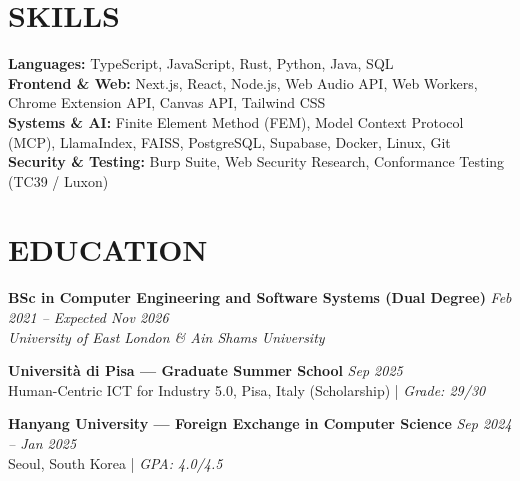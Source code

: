 \documentclass[10pt,letterpaper]{article}
\begin{document}
\section*{SKILLS}
\begin{itemize}[leftmargin=0pt, label={}]
    \small{\item{
     \textbf{Languages:} TypeScript, JavaScript, Rust, Python, Java, SQL \\
     \textbf{Frontend \& Web:} Next.js, React, Node.js, Web Audio API, Web Workers, Chrome Extension API, Canvas API, Tailwind CSS \\
     \textbf{Systems \& AI:} Finite Element Method (FEM), Model Context Protocol (MCP), LlamaIndex, FAISS, PostgreSQL, Supabase, Docker, Linux, Git \\
     \textbf{Security \& Testing:} Burp Suite, Web Security Research, Conformance Testing (TC39 / Luxon)
    }}
\end{itemize}

\section*{EDUCATION}

\textbf{BSc in Computer Engineering and Software Systems (Dual Degree)} \hfill \textit{Feb 2021 -- Expected Nov 2026}\\
\textit{University of East London \& Ain Shams University}

\textbf{Università di Pisa --- Graduate Summer School} \hfill \textit{Sep 2025}\\
Human-Centric ICT for Industry 5.0, Pisa, Italy (Scholarship) | \textit{Grade: 29/30}

\textbf{Hanyang University --- Foreign Exchange in Computer Science} \hfill \textit{Sep 2024 -- Jan 2025}\\
Seoul, South Korea | \textit{GPA: 4.0/4.5}
\end{document}
